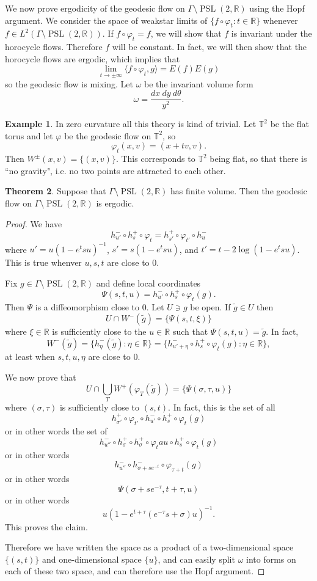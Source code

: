 \documentclass[12pt]{report}
\newcommand{\RR}{\mathbb{R}}
\newcommand{\TT}{\mathbb{T}}
\newcommand{\PSL}{\operatorname{PSL}}
\theoremstyle{definition}
\newtheorem{theorem}{Theorem}[chapter]
\newtheorem{example}[theorem]{Example}
\begin{document}
We now prove ergodicity of the geodesic flow on $\Gamma \setminus \PSL(2, \RR)$ using the Hopf argument.
We consider the space of weakstar limits of $\{f \circ \varphi_t: t\in \RR\}$ whenever $f \in L^2(\Gamma \setminus \PSL(2, \RR))$.
If $f \circ \varphi_t = f$, we will show that $f$ is invariant under the horocycle flows. Therefore $f$ will be constant.
In fact, we will then show that the horocycle flows are ergodic, which implies that
$$\lim_{t\to \pm \infty}\langle f \circ \varphi_t, g\rangle = E(f)E(g)$$
so the geodesic flow is mixing. Let $\omega$ be the invariant volume form
$$\omega = \frac{dx~dy~d\theta}{y^2}.$$

\begin{example}
In zero curvature all this theory is kind of trivial. Let $\TT^2$ be the flat torus and let $\varphi$ be the geodesic flow on $\TT^2$, so
$$\varphi_t(x, v) = (x + tv, v).$$
Then $W^\pm(x, v) = \{(x, v)\}$. This corresponds to $\TT^2$ being flat, so that there is ``no gravity", i.e. no two points are attracted to each other.
\end{example}

\begin{theorem}
Suppose that $\Gamma \setminus \PSL(2, \RR)$ has finite volume. Then the geodesic flow on $\Gamma \setminus \PSL(2, \RR)$ is ergodic.
\end{theorem}
\begin{proof}
We have
$$h_{u'}^- \circ h_s^+ \circ \varphi_t = h_{s'}^+ \circ \varphi_{t'} \circ h_u^-$$
where $u' = u(1-e^tsu)^{-1}$, $s' = s(1 - e^tsu)$, and $t' = t - 2\log (1 - e^tsu)$. This is true whenver $u,s,t$ are close to $0$.

Fix $g \in \Gamma \setminus \PSL(2, \RR)$ and define local coordinates
$$\Psi(s, t, u) = h_{u'}^- \circ h_s^+ \circ \varphi_t(g).$$
Then $\Psi$ is a diffeomorphism close to $0$. Let $U \ni g$ be open. If $\tilde g \in U$ then
$$U \cap W^-(\tilde g) = \{\Psi(s, t, \xi)\}$$
where $\xi \in \RR$ is sufficiently close to the $u \in \RR$ such that $\Psi(s, t, u) = \tilde g$. In fact,
$$W^-(\tilde g) = \{h^-_\eta(\tilde g): \eta \in \RR\} = \{h_{u' + \eta}^- \circ h_s^+ \circ \varphi_t(g): \eta \in \RR\},$$
at least when $s,t,u,\eta$ are close to $0$.

We now prove that
$$U \cap \bigcup_T W^+(\varphi_T(\tilde g)) = \{\Psi(\sigma, \tau, u)\}$$
where $(\sigma,\tau)$ is sufficiently close to $(s, t)$. In fact, this is the set of all
$$h_{\sigma'}^+ \circ \varphi_{t'} \circ h^-_{u'} \circ h_s^+ \circ \varphi_t(g)$$
or in other words the set of
$$h_{u''}^- \circ h_\sigma^+ \circ h_\sigma^+ \circ \varphi_tau \circ h_s^+ \circ \varphi_t(g)$$
or in other words
$$h_{u''}^- \circ h_{\sigma + se^{-t}}^- \circ \varphi_{\tau + t}(g)$$
or in other words
$$\Psi(\sigma + se^{-\tau}, t + \tau, u)$$
or in other words
$$u(1 - e^{t + \tau}(e^{-\tau}s + \sigma)u)^{-1}.$$
This proves the claim.

Therefore we have written the space as a product of a two-dimensional space $\{(s, t)\}$ and one-dimensional space $\{u\}$, and can easily split $\omega$ into forms on each of these two space, and can therefore use the Hopf argument.
\end{proof}
\end{document}
